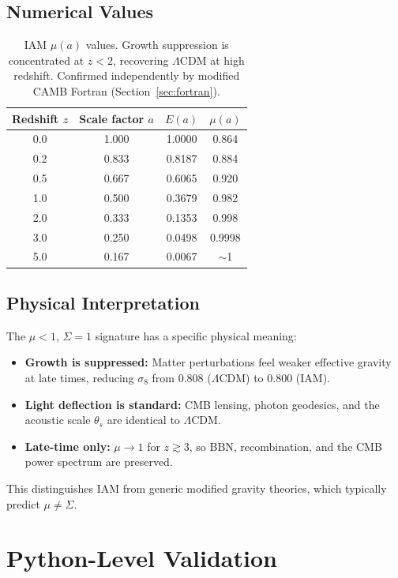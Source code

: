 \documentclass[11pt,letterpaper]{article}
\begin{document}
\subsection{Numerical Values}

\begin{table}[h]
\centering
\begin{tabular}{cccc}
\toprule
Redshift $z$ & Scale factor $a$ & $E(a)$ & $\mu(a)$ \\
\midrule
0.0 & 1.000 & 1.0000 & 0.864 \\
0.2 & 0.833 & 0.8187 & 0.884 \\
0.5 & 0.667 & 0.6065 & 0.920 \\
1.0 & 0.500 & 0.3679 & 0.982 \\
2.0 & 0.333 & 0.1353 & 0.998 \\
3.0 & 0.250 & 0.0498 & 0.9998 \\
5.0 & 0.167 & 0.0067 & $\sim$1 \\
\bottomrule
\end{tabular}
\caption{IAM $\mu(a)$ values. Growth suppression is concentrated at $z < 2$, recovering $\Lambda$CDM at high redshift. Confirmed independently by modified CAMB Fortran (Section~\ref{sec:fortran}).}
\label{tab:mu_values}
\end{table}

\subsection{Physical Interpretation}

The $\mu < 1$, $\Sigma = 1$ signature has a specific physical meaning:
\begin{itemize}
\item \textbf{Growth is suppressed:} Matter perturbations feel weaker effective gravity at late times, reducing $\sigma_8$ from 0.808 ($\Lambda$CDM) to 0.800 (IAM).
\item \textbf{Light deflection is standard:} CMB lensing, photon geodesics, and the acoustic scale $\theta_s$ are identical to $\Lambda$CDM.
\item \textbf{Late-time only:} $\mu \to 1$ for $z \gtrsim 3$, so BBN, recombination, and the CMB power spectrum are preserved.
\end{itemize}

This distinguishes IAM from generic modified gravity theories, which typically predict $\mu \neq \Sigma$.

\section{Python-Level Validation}
\end{document}
